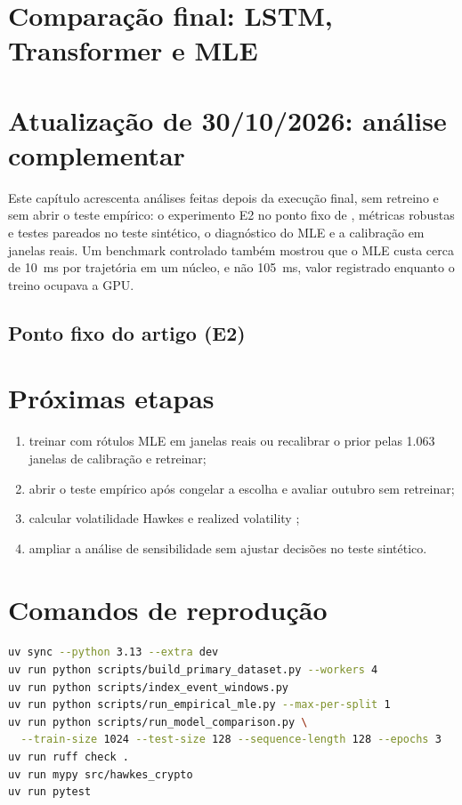 \documentclass[12pt,a4paper]{report}
\begin{document}
\chapter{Comparação final: LSTM, Transformer e MLE}



\chapter{Atualização de 30/10/2026: análise complementar}
\label{cap:atualizacao}

Este capítulo acrescenta análises feitas depois da execução final, sem retreino e sem
abrir o teste empírico: o experimento E2 no ponto fixo de \citet{lee2023}, métricas
robustas e testes pareados no teste sintético, o diagnóstico do MLE e a calibração em
janelas reais. Um benchmark controlado também mostrou que o MLE custa cerca de 10~ms
por trajetória em um núcleo, e não 105~ms, valor registrado enquanto o treino ocupava
a GPU.

\section{Ponto fixo do artigo (E2)}





\chapter{Próximas etapas}

\begin{enumerate}
  \item treinar com rótulos MLE em janelas reais ou recalibrar o prior pelas 1.063
  janelas de calibração e retreinar;
  \item abrir o teste empírico após congelar a escolha e avaliar outubro sem retreinar;
  \item calcular volatilidade Hawkes e realized volatility \citep{andersen2003};
  \item ampliar a análise de sensibilidade sem ajustar decisões no teste sintético.
\end{enumerate}

\appendix
\chapter{Comandos de reprodução}

\begin{lstlisting}[language=bash]
uv sync --python 3.13 --extra dev
uv run python scripts/build_primary_dataset.py --workers 4
uv run python scripts/index_event_windows.py
uv run python scripts/run_empirical_mle.py --max-per-split 1
uv run python scripts/run_model_comparison.py \
  --train-size 1024 --test-size 128 --sequence-length 128 --epochs 3
uv run ruff check .
uv run mypy src/hawkes_crypto
uv run pytest
\end{lstlisting}



\end{document}
